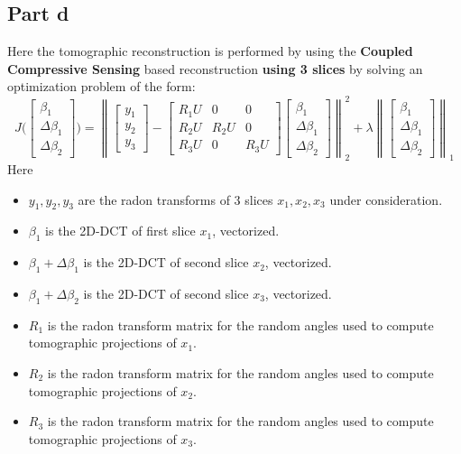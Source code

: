 \documentclass[12pt]{article}
\newcommand{\norm}[1]{\left\lVert #1 \right\rVert}
\begin{document}
\subsection*{Part d}
Here the tomographic reconstruction is performed by using the \textbf{Coupled Compressive Sensing} based reconstruction \textbf{using 3 slices} by solving an optimization problem of the form:
$$J\bigg(\begin{bmatrix}
\beta_1 \\ \Delta \beta_1 \\ \Delta \beta_2
\end{bmatrix}\bigg) = \norm{\begin{bmatrix}
	y_1\\y_2\\y_3
	\end{bmatrix} - \begin{bmatrix}
	R_1U & 0 & 0\\
	R_2U & R_2U & 0\\
	R_3U & 0 & R_3U
	\end{bmatrix} \begin{bmatrix}
	\beta_1 \\ \Delta \beta_1\\ \Delta \beta_2
	\end{bmatrix}}_2^2 + \lambda \norm{\begin{bmatrix}
	\beta_1 \\ \Delta \beta_1\\ \Delta \beta_2
	\end{bmatrix}}_1$$
\newpage
Here 
\begin{itemize}
 \item  $y_1, y_2, y_3$ are the radon transforms of 3 slices $x_1, x_2, x_3$ under consideration.
 \item $\beta_1$ is the 2D-DCT of first slice $x_1$, vectorized.
  \item $\beta_1 + \Delta \beta_1$ is the 2D-DCT of second slice $x_2$, vectorized.
  \item $\beta_1 + \Delta \beta_2$ is the 2D-DCT of second slice $x_3$, vectorized.
  \item $R_1$ is the radon transform matrix for the random angles used to compute tomographic projections of $x_1$.
  \item $R_2$ is the radon transform matrix for the random angles used to compute tomographic projections of $x_2$.
  \item $R_3$ is the radon transform matrix for the random angles used to compute tomographic projections of $x_3$.
\end{itemize}
\end{document}
